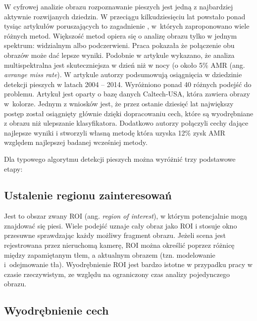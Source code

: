 W cyfrowej analizie obrazu rozpoznawanie pieszych jest jedną z najbardziej aktywnie rozwijanych dziedzin. 
W przeciągu kilkudziesięciu lat powstało ponad tysiąc artykułów poruszających to zagadnienie \cite{zhang2015filtered}, w~których zaproponowano wiele różnych metod. 
Większość metod opiera się o analizę obrazu tylko w jednym spektrum: widzialnym albo podczerwieni. 
Praca \cite{hwang2015multispectral} pokazała że połączenie obu obrazów może dać lepsze wyniki. 
Podobnie w artykule \cite{gonzalez2016pedestrian} wykazano, że analiza multispektralna jest skuteczniejsza w dzień niż w nocy (o około 5\% AMR (ang. \textit{avrange miss rate}). 
W artykule \cite{benenson2014ten} autorzy podsumowują osiągnięcia w dziedzinie detekcji pieszych w latach 2004 -- 2014. 
Wyróżniono ponad 40 różnych podejść do problemu. 
Artykuł jest oparty o bazę danych Caltech-USA, która zawiera obrazy w~kolorze. %
Jednym z wniosków jest, że przez ostanie dziesięć lat największy postęp został osiągnięty głównie dzięki dopracowaniu cech, które są wyodrębniane z obrazu niż ulepszanie klasyfikatora. 
Dodatkowo autorzy połączyli cechy dające najlepsze wyniki i stworzyli własną metodę która uzyska 12\% zysk AMR względem najlepszej badanej wcześniej metody.


Dla typowego algorytmu detekcji pieszych można wyróżnić trzy podstawowe etapy:

\subsection{Ustalenie regionu zainteresowań} 

Jest to obszar zwany ROI (ang. \textit{region of interest}), w którym potencjalnie mogą znajdować się piesi. 
Wiele podejść uznaje cały obraz jako ROI i stosuje okno przesuwne sprawdzając każdy możliwy fragment obrazu. 
Jeżeli scena jest rejestrowana przez nieruchomą kamerę, ROI można określić poprzez różnicę między zapamiętanym tłem, a aktualnym obrazem (tzn. modelowanie i~odejmowanie tła). 
Wyodrębnienie ROI jest bardzo istotne w przypadku pracy w czasie rzeczywistym, ze względu na ograniczony czas analizy pojedynczego obrazu.


\subsection{Wyodrębnienie cech}

